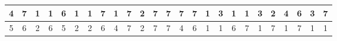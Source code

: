 \begin{sidewaystable}[]
\begin{tabular}{|c|c|c|c|c|c|c|c|c|c|c|c|c|c|c|c|c|c|c|c|c|c|c|c|c|}
    4       & 7                                               & 1                                               & 1                                               & 6                                               & 1                                               & 1                                               & 7                                               & 1                                               & 7                                               & 2                                                & 7                                                & 7                                                & 7                                               & 7                                               & 1                                               & 3                                               & 1                                               & 1                                               & 3                                               & 2                                               & 4                                               & 6                                                & 3                                                & 7                                                \\ \hline
    5       & 6                                               & 2                                               & 6                                               & 5                                               & 2                                               & 2                                               & 6                                               & 4                                               & 7                                               & 2                                                & 7                                                & 7                                                & 4                                               & 6                                               & 1                                               & 1                                               & 6                                               & 7                                               & 1                                               & 7                                               & 1                                               & 7                                                & 1                                                & 1                                                \\ \hline

\end{tabular}
\end{sidewaystable}
